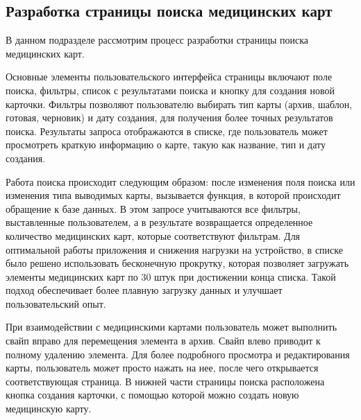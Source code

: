\subsection{Разработка страницы поиска медицинских карт}
В данном подразделе рассмотрим процесс разработки страницы поиска медицинских карт.

Основные элементы пользовательского интерфейса страницы включают поле поиска, фильтры, список с результатами поиска и кнопку для создания новой карточки. Фильтры позволяют пользователю выбирать тип карты (архив, шаблон, готовая, черновик) и дату создания, для получения более точных результатов поиска. Результаты запроса отображаются в списке, где пользователь может просмотреть краткую информацию о карте, такую как название, тип и дату создания. 

Работа поиска происходит следующим образом: после изменения поля поиска или изменения типа выводимых карты, вызывается функция, в которой происходит обращение к базе данных. В этом запросе учитываются все фильтры, выставленные пользователем, а в результате возвращается определенное количество медицинских карт, которые соответствуют фильтрам. Для оптимальной работы приложения и снижения нагрузки на устройство, в списке было решено использовать бесконечную прокрутку, которая позволяет загружать элементы медицинских карт по 30 штук при достижении конца списка. Такой подход обеспечивает более плавную загрузку данных и улучшает пользовательский опыт.

При взаимодействии с медицинскими картами пользователь может выполнить свайп вправо для перемещения элемента в архив. Свайп влево приводит к полному удалению элемента. Для более подробного просмотра и редактирования карты, пользователь может просто нажать на нее, после чего открывается соответствующая страница. В нижней части страницы поиска расположена кнопка создания карточки, с помощью которой можно создать новую медицинскую карту.

